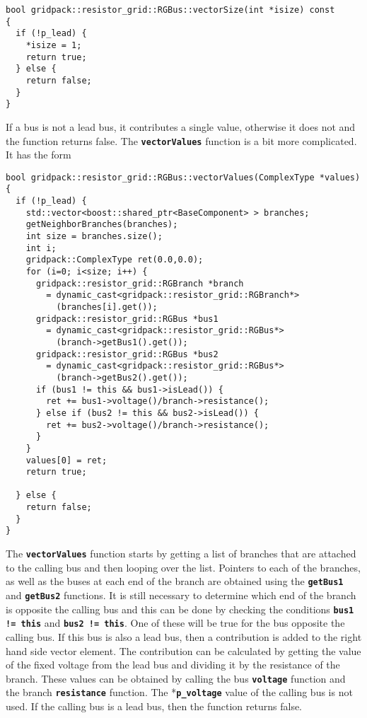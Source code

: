 {
\color{red}
\begin{Verbatim}[fontseries=b]
bool gridpack::resistor_grid::RGBus::vectorSize(int *isize) const
{
  if (!p_lead) {
    *isize = 1;
    return true;
  } else {
    return false;
  }
}
\end{Verbatim}
}

If a bus is not a lead bus, it contributes a single value, otherwise it does not and the function returns false. The \texttt{\textbf{vectorValues}} function is a bit more complicated. It has the form

{
\color{red}
\begin{Verbatim}[fontseries=b]
bool gridpack::resistor_grid::RGBus::vectorValues(ComplexType *values)
{
  if (!p_lead) {
    std::vector<boost::shared_ptr<BaseComponent> > branches;
    getNeighborBranches(branches);
    int size = branches.size();
    int i;
    gridpack::ComplexType ret(0.0,0.0);
    for (i=0; i<size; i++) {
      gridpack::resistor_grid::RGBranch *branch
        = dynamic_cast<gridpack::resistor_grid::RGBranch*>
          (branches[i].get());
      gridpack::resistor_grid::RGBus *bus1
        = dynamic_cast<gridpack::resistor_grid::RGBus*>
          (branch->getBus1().get());
      gridpack::resistor_grid::RGBus *bus2
        = dynamic_cast<gridpack::resistor_grid::RGBus*>
          (branch->getBus2().get());
      if (bus1 != this && bus1->isLead()) {
        ret += bus1->voltage()/branch->resistance();
      } else if (bus2 != this && bus2->isLead()) {
        ret += bus2->voltage()/branch->resistance();
      }
    }
    values[0] = ret;
    return true;

  } else {
    return false;
  }
}
\end{Verbatim}
}

The \texttt{\textbf{vectorValues}} function starts by getting a list of branches that are attached to the calling bus and then looping over the list. Pointers to each of the branches, as well as the buses at each end of the branch are obtained using the \texttt{\textbf{getBus1}} and \texttt{\textbf{getBus2}} functions. It is still necessary to determine which end of the branch is opposite the calling bus and this can be done by checking the conditions \texttt{\textbf{bus1 != this}} and \texttt{\textbf{bus2 != this}}. One of these will be true for the bus opposite the calling bus. If this bus is also a lead bus, then a contribution is added to the right hand side vector element. The contribution can be calculated by getting the value of the fixed voltage from the lead bus and dividing it by the resistance of the branch. These values can be obtained by calling the bus \texttt{\textbf{voltage}} function and the branch \texttt{\textbf{resistance}} function. The *\texttt{\textbf{p\_voltage}} value of the calling bus is not used. If the calling bus is a lead bus, then the function returns false.

